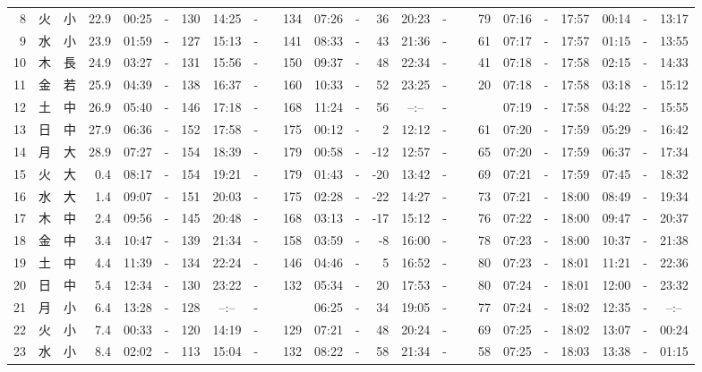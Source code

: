 \documentclass[12pt,a4j]{jsarticle}
\begin{document}
\begin{table}[htbp]
\begin{center}
{\begin{tabular}{|rc|cr|ccrccr|ccrccr|ccc|ccc|}
 8 & 火 & 小 & 22.9 &  00:25 &-& 130 &  14:25 &-& 134 &  07:26 &-&  36 &  20:23 &-&  79 & 07:16 & -& 17:57 & 00:14 & -& 13:17 \\
 9 & 水 & 小 & 23.9 &  01:59 &-& 127 &  15:13 &-& 141 &  08:33 &-&  43 &  21:36 &-&  61 & 07:17 & -& 17:57 & 01:15 & -& 13:55 \\
10 & 木 & 長 & 24.9 &  03:27 &-& 131 &  15:56 &-& 150 &  09:37 &-&  48 &  22:34 &-&  41 & 07:18 & -& 17:58 & 02:15 & -& 14:33 \\
11 & 金 & 若 & 25.9 &  04:39 &-& 138 &  16:37 &-& 160 &  10:33 &-&  52 &  23:25 &-&  20 & 07:18 & -& 17:58 & 03:18 & -& 15:12 \\
12 & 土 & 中 & 26.9 &  05:40 &-& 146 &  17:18 &-& 168 &  11:24 &-&  56 &  --:-- &-&~~~~~ & 07:19 & -& 17:58 & 04:22 & -& 15:55 \\
13 & 日 & 中 & 27.9 &  06:36 &-& 152 &  17:58 &-& 175 &  00:12 &-&   2 &  12:12 &-&  61 & 07:20 & -& 17:59 & 05:29 & -& 16:42 \\
14 & 月 & 大 & 28.9 &  07:27 &-& 154 &  18:39 &-& 179 &  00:58 &-& -12 &  12:57 &-&  65 & 07:20 & -& 17:59 & 06:37 & -& 17:34 \\
15 & 火 & 大 &  0.4 &  08:17 &-& 154 &  19:21 &-& 179 &  01:43 &-& -20 &  13:42 &-&  69 & 07:21 & -& 17:59 & 07:45 & -& 18:32 \\
16 & 水 & 大 &  1.4 &  09:07 &-& 151 &  20:03 &-& 175 &  02:28 &-& -22 &  14:27 &-&  73 & 07:21 & -& 18:00 & 08:49 & -& 19:34 \\
17 & 木 & 中 &  2.4 &  09:56 &-& 145 &  20:48 &-& 168 &  03:13 &-& -17 &  15:12 &-&  76 & 07:22 & -& 18:00 & 09:47 & -& 20:37 \\
18 & 金 & 中 &  3.4 &  10:47 &-& 139 &  21:34 &-& 158 &  03:59 &-&  -8 &  16:00 &-&  78 & 07:23 & -& 18:00 & 10:37 & -& 21:38 \\
19 & 土 & 中 &  4.4 &  11:39 &-& 134 &  22:24 &-& 146 &  04:46 &-&   5 &  16:52 &-&  80 & 07:23 & -& 18:01 & 11:21 & -& 22:36 \\
20 & 日 & 中 &  5.4 &  12:34 &-& 130 &  23:22 &-& 132 &  05:34 &-&  20 &  17:53 &-&  80 & 07:24 & -& 18:01 & 12:00 & -& 23:32 \\
21 & 月 & 小 &  6.4 &  13:28 &-& 128 &  --:-- &-&~~~~~ &  06:25 &-&  34 &  19:05 &-&  77 & 07:24 & -& 18:02 & 12:35 & -& --:-- \\
22 & 火 & 小 &  7.4 &  00:33 &-& 120 &  14:19 &-& 129 &  07:21 &-&  48 &  20:24 &-&  69 & 07:25 & -& 18:02 & 13:07 & -& 00:24 \\
23 & 水 & 小 &  8.4 &  02:02 &-& 113 &  15:04 &-& 132 &  08:22 &-&  58 &  21:34 &-&  58 & 07:25 & -& 18:03 & 13:38 & -& 01:15 \\

\end{tabular}}
\end{center}
\end{table}
\end{document}
